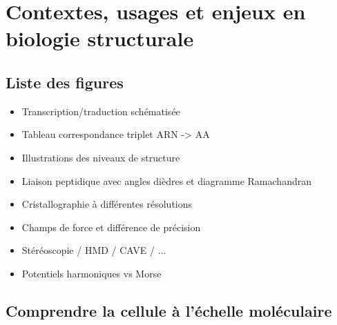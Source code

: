 \chapter[Contextes, usages et enjeux en biologie structurale]{Contextes, usages et enjeux en biologie structurale}
\minitoc
\cleardoublepage




\section{Liste des figures}


\begin{itemize}
	\item Transcription/traduction schématisée
	\item Tableau correspondance triplet ARN -> AA
	\item Illustrations des niveaux de structure
	\item Liaison peptidique avec angles dièdres et diagramme Ramachandran
	\item Cristallographie à différentes résolutions
	\item Champs de force et différence de précision
	\item Stéréoscopie / HMD / CAVE / ...
	\item Potentiels harmoniques vs Morse
\end{itemize}

\section{Comprendre la cellule à l'échelle moléculaire}

